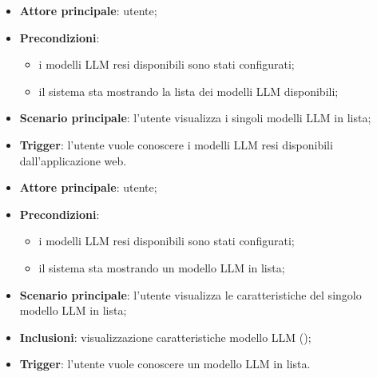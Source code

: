 \documentclass[10pt, a4paper]{article}
\begin{document}
    \begin{itemize}
        \item \textbf{Attore principale}: utente;
        \item \textbf{Precondizioni}: 
        \begin{itemize}
            \item i modelli LLM resi disponibili sono stati configurati;
            \item il sistema sta mostrando la lista dei modelli LLM disponibili;
        \end{itemize}
        \item \textbf{Scenario principale}: l’utente visualizza i singoli modelli LLM in lista;
        \item \textbf{Trigger}: l’utente vuole conoscere i modelli LLM resi disponibili dall’applicazione web.
    \end{itemize}

    \begin{itemize}
        \item \textbf{Attore principale}: utente;
        \item \textbf{Precondizioni}: 
        \begin{itemize}
            \item i modelli LLM resi disponibili sono stati configurati;
            \item il sistema sta mostrando un modello LLM in lista;
        \end{itemize}
        \item \textbf{Scenario principale}: l'utente visualizza le caratteristiche del singolo modello LLM in lista;
        \item \textbf{Inclusioni}: visualizzazione caratteristiche modello LLM ();
        \item \textbf{Trigger}: l’utente vuole conoscere un modello LLM in lista.
    \end{itemize}
    
\end{document}
